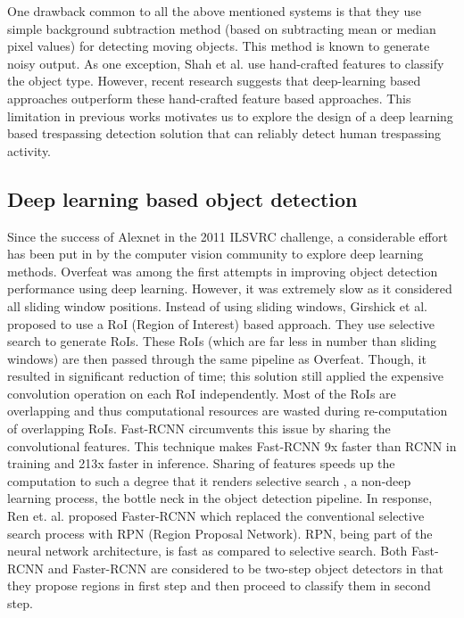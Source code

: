 One drawback common to all the above mentioned systems is that they use simple background subtraction method (based on subtracting mean or median pixel values) for detecting moving objects. This method is known to generate noisy output\cite{stauffer1999adaptive}. As one exception, Shah et al.\cite{shah2007automated} use hand-crafted features to classify the object type. However, recent research suggests that deep-learning based approaches outperform these hand-crafted feature based approaches\cite{benenson2014ten}. This limitation in previous works motivates us to explore the design of a deep learning based trespassing detection solution that can reliably detect human trespassing activity. 

\subsection{Deep learning based object detection}
Since the success of Alexnet\cite{krizhevsky2012imagenet} in the 2011 ILSVRC\cite{russakovsky2015imagenet} challenge, a considerable effort has been put in by the computer vision community to explore deep learning methods. Overfeat\cite{sermanet2013overfeat} was among the first attempts in improving object detection performance using deep learning. However, it was extremely slow as it considered all sliding window positions. Instead of using sliding windows, Girshick et al.\cite{girshick2014rich} proposed to use a RoI (Region of Interest) based approach. They use selective search\cite{uijlings2013selective} to generate RoIs. These RoIs (which are far less in number than sliding windows) are then passed through the same pipeline as Overfeat.  Though, it resulted in significant reduction of time; this solution still applied the expensive convolution operation on each RoI independently. Most of the RoIs are overlapping and thus computational resources are wasted during re-computation of overlapping RoIs. Fast-RCNN\cite{ref_fastrcnn} circumvents this issue by sharing the convolutional features. This technique makes Fast-RCNN 9x faster than RCNN\cite{girshick2014rich} in training and 213x faster in inference\cite{ref_fastrcnn}. Sharing of features speeds up the computation to such a degree that it renders selective search \cite{uijlings2013selective}, a non-deep learning process, the bottle neck in the object detection pipeline. In response, Ren et. al. proposed Faster-RCNN\cite{ref_fasterrcnn} which replaced the conventional selective search process with RPN (Region Proposal Network). RPN, being part of the neural network architecture, is fast as compared to selective search. Both Fast-RCNN and Faster-RCNN are considered to be two-step object detectors in that they propose regions in first step and then proceed to classify them in second step.

